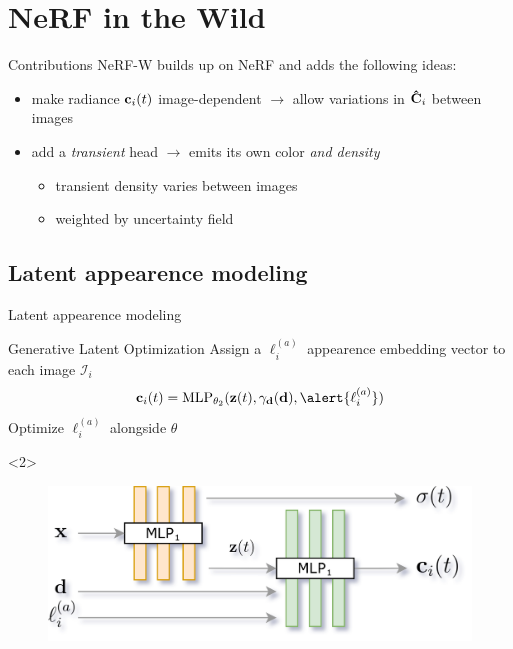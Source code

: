 \documentclass[aspectratio=1610,handout]{beamer}
\begin{document}
\section{NeRF in the Wild}
\begin{frame}{Contributions}
    NeRF-W builds up on NeRF and adds the following ideas:
    \bigskip
    \pause
    \begin{itemize}
        \item make radiance \(\vb{c}_i (t)\) image-dependent \(\rightarrow\) allow variations in \(\vb{\hat{C}}_i\) between images 
        \pause 
        \item add a \emph{transient} head \(\rightarrow\) emits its own color \emph{and density}
        \begin{itemize}
            \item transient density varies between images
            \item weighted by uncertainty field
        \end{itemize}
    \end{itemize}
\end{frame}

\subsection*{Latent appearence modeling}
\begin{frame}{Latent appearence modeling}
    \begin{block}{Generative Latent Optimization}
        Assign a \(\ell_i^{(a)}\) 
        appearence embedding vector to each image \(\mathcal{I}_i\)
        \begin{equation*}
            \vb{c}_i(t) = \textrm{MLP}_{\theta_2} (\vb{z}(t), \gamma_{\vb{d}}(\vb{d}), \alert{\ell_i^{(a)}})
        \end{equation*}
        Optimize \(\ell_i^{(a)}\) alongside \(\theta\)
    \end{block}
    \begin{onlyenv}<2>
        \bigskip
        \begin{figure}[H]
            \centering
            \includegraphics[width=.65\textwidth,keepaspectratio]{nerfa-architecture.png}
        \end{figure}
    \end{onlyenv}
\end{frame}
\end{document}
